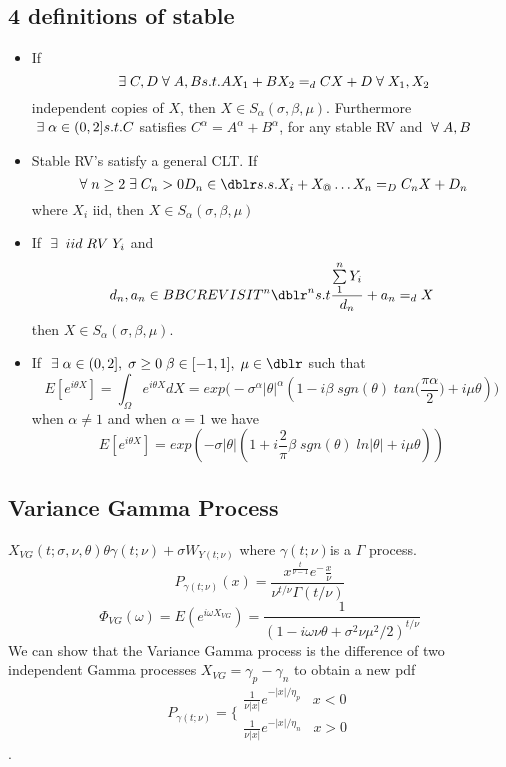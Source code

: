 \subsection{4 definitions of stable}
\begin{itemize}
    \item If \[\; \exists \; C, D \; \forall \; A,B s.t. A X_1+BX_2=_dCX+D
        \; \forall \; X_1,X_2\] independent copies of $X$, then $X
        \in S_\alpha(\sigma,\beta,\mu)$. Furthermore $\; \exists \;
        \alpha \in (0,2] s.t. C$ satisfies
        $C^\alpha=A^\alpha+B^\alpha$, for any stable RV and
        $\; \forall \; A,B$
    \item Stable RV's satisfy a general CLT. If \[\fall n
        \geq 2 \exts C_n>0 D_n \in \dblr s.s. X_i+X_@
        \hdots X_n=_D C_n X+D_n\] where ${X_i}$ iid, then
        $X \in S_\alpha(\sigma,\beta,\mu)$
    \item If $\; \exists \; \; iid \; RV \;{Y_i}$ and \[{d_n},
        {a_n} \in BBCREVISIT^n \dblr^n s.t
        \frac{\sum\limits_{1}^{n} Y_i}{d_n}+a_n=_d X\] then
        $X \in S_\alpha(\sigma,\beta,\mu)$.
    \item If $\exts \alpha \in (0,2], \; \sigma \geq0 \;
        \beta \in [-1,1], \; \mu \in \dblr$ such that
    \[ E[e^{i \theta X}]=\int_\Omega e^{i \theta X} dX = exp\bigr(
    -\sigma^\alpha |\theta|^\alpha (1-i \beta \;sgn(\theta)\; tan
    \bigl(\frac{\pi \alpha}{2} \bigr) + i \mu \theta)\bigl) \] when $\alpha \neq 1$
    and when $\alpha =1$ we have \[E[e^{i \theta X}]=exp (
    -\sigma |\theta|(1+i \frac{2}{\pi} \beta \; sgn(\theta)
    \; ln|\theta| + i \mu \theta) )\]
\end{itemize}



\subsection{Variance Gamma Process}
$X_{VG}(t;\sigma,\nu,\theta)\theta  \gamma(t;\nu)+\sigma
W_{Y(t;\nu)}$ where $\gamma(t;\nu)$is a $\Gamma$ process.
\[P_{\gamma(t;\nu)}(x)=\frac{  x^{\frac{t}{\nu-1}} e^-\frac{x}{\nu}
} {\nu^{t/ \nu} \Gamma( t/ \nu)}\]  \[\Phi_{VG}(\omega)=E(e^{i
\omega X_{VG}}) = \frac{1}{(1-i \omega \nu \theta + \sigma^2
\nu \mu^2 / 2)^{t / \nu}}\]  We can show that the Variance
Gamma process is the difference of two independent Gamma
processes $ X_{VG}=\gamma_p - \gamma_n$ to obtain a new pdf
\[P_{\gamma(t;\nu)} =\biggl\{\begin{array}{cc} \frac{1}{\nu |x|} e^{-|x| / \eta_p} \;\;\;  x<0 \\
\frac{1}{\nu |x|} e^{-|x| / \eta_n} \;\;\;  x>0
\end{array} \].
%

